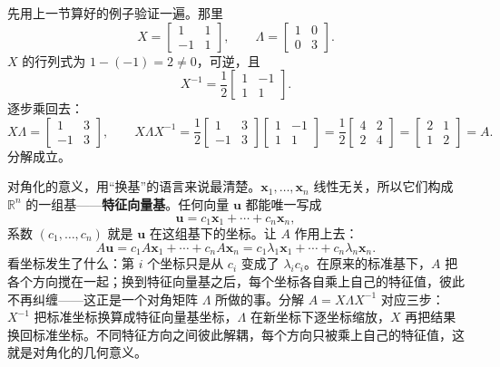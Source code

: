 \documentclass[UTF8,a4paper,12pt]{ctexart}
\numberwithin{equation}{section}
\newcommand{\R}{\mathbb{R}}
\begin{document}
	先用上一节算好的例子验证一遍。那里
	\begin{equation}\label{eq:7.28}
	X=
	\begin{bmatrix}
		1&1\\
		-1&1
	\end{bmatrix},
	\qquad
	\Lambda=
	\begin{bmatrix}
		1&0\\
		0&3
	\end{bmatrix}.
	\end{equation}
	$X$ 的行列式为 $1-(-1)=2\neq0$，可逆，且
	\begin{equation}\label{eq:7.29}
	X^{-1}=\frac{1}{2}
	\begin{bmatrix}
		1&-1\\
		1&1
	\end{bmatrix}.
	\end{equation}
	逐步乘回去：
	\begin{equation}\label{eq:7.30}
	X\Lambda=
	\begin{bmatrix}
		1&3\\
		-1&3
	\end{bmatrix},
	\qquad
	X\Lambda X^{-1}
	=\frac{1}{2}
	\begin{bmatrix}
		1&3\\
		-1&3
	\end{bmatrix}
	\begin{bmatrix}
		1&-1\\
		1&1
	\end{bmatrix}
	=\frac{1}{2}
	\begin{bmatrix}
		4&2\\
		2&4
	\end{bmatrix}
	=
	\begin{bmatrix}
		2&1\\
		1&2
	\end{bmatrix}
	=A.
	\end{equation}
	分解成立。

	对角化的意义，用“换基”的语言来说最清楚。$\bm{x}_1,\ldots,\bm{x}_n$ 线性无关，所以它们构成 $\R^n$ 的一组基——\textbf{特征向量基}。任何向量 $\bm{u}$ 都能唯一写成
	\begin{equation}\label{eq:7.31}
	\bm{u}=c_1\bm{x}_1+\cdots+c_n\bm{x}_n,
	\end{equation}
	系数 $(c_1,\ldots,c_n)$ 就是 $\bm{u}$ 在这组基下的坐标。让 $A$ 作用上去：
	\begin{equation}\label{eq:7.32}
	A\bm{u}
	=c_1A\bm{x}_1+\cdots+c_nA\bm{x}_n
	=c_1\lambda_1\bm{x}_1+\cdots+c_n\lambda_n\bm{x}_n.
	\end{equation}
	看坐标发生了什么：第 $i$ 个坐标只是从 $c_i$ 变成了 $\lambda_i c_i$。在原来的标准基下，$A$ 把各个方向搅在一起；换到特征向量基之后，每个坐标各自乘上自己的特征值，彼此不再纠缠——这正是一个对角矩阵 $\Lambda$ 所做的事。分解 $A=X\Lambda X^{-1}$ 对应三步：$X^{-1}$ 把标准坐标换算成特征向量基坐标，$\Lambda$ 在新坐标下逐坐标缩放，$X$ 再把结果换回标准坐标。不同特征方向之间彼此解耦，每个方向只被乘上自己的特征值，这就是对角化的几何意义。
\end{document}
